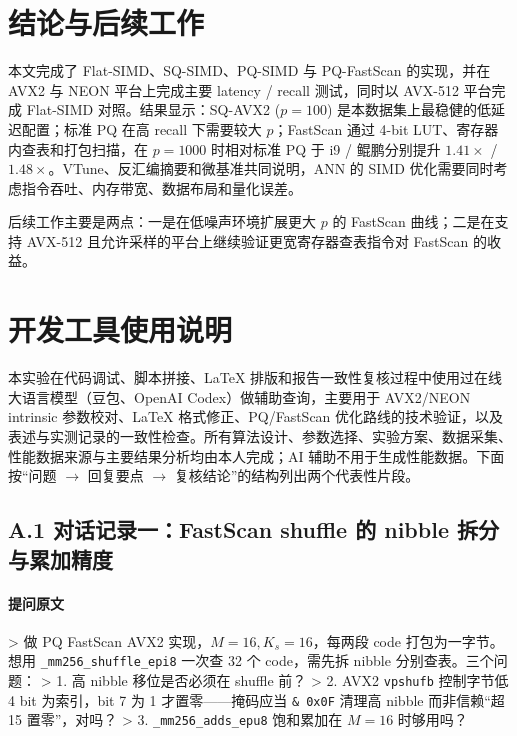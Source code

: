 \documentclass[a4paper,11pt,UTF8]{ctexart}
\begin{document}
\section{结论与后续工作}

本文完成了 Flat-SIMD、SQ-SIMD、PQ-SIMD 与 PQ-FastScan 的实现，并在 AVX2 与 NEON 平台上完成主要 latency / recall 测试，同时以 AVX-512 平台完成 Flat-SIMD 对照。结果显示：SQ-AVX2 ($p=100$) 是本数据集上最稳健的低延迟配置；标准 PQ 在高 recall 下需要较大 $p$；FastScan 通过 4-bit LUT、寄存器内查表和打包扫描，在 $p=1000$ 时相对标准 PQ 于 i9 / 鲲鹏分别提升 $1.41\times$ / $1.48\times$。VTune、反汇编摘要和微基准共同说明，ANN 的 SIMD 优化需要同时考虑指令吞吐、内存带宽、数据布局和量化误差。

后续工作主要是两点：一是在低噪声环境扩展更大 $p$ 的 FastScan 曲线；二是在支持 AVX-512 且允许采样的平台上继续验证更宽寄存器查表指令对 FastScan 的收益。

\label{sec:endbody}
\label{LastBodyPage}

\clearpage
\appendix
\setcounter{page}{1}
\renewcommand{\thepage}{A-\arabic{page}}
\cfoot{\thepage}
\section{开发工具使用说明}

本实验在代码调试、脚本拼接、\LaTeX{} 排版和报告一致性复核过程中使用过在线大语言模型（豆包、OpenAI Codex）做辅助查询，主要用于 AVX2/NEON intrinsic 参数校对、\LaTeX{} 格式修正、PQ/FastScan 优化路线的技术验证，以及表述与实测记录的一致性检查。所有算法设计、参数选择、实验方案、数据采集、性能数据来源与主要结果分析均由本人完成；AI 辅助不用于生成性能数据。下面按``问题 $\to$ 回复要点 $\to$ 复核结论''的结构列出两个代表性片段。

\subsection*{A.1 对话记录一：FastScan shuffle 的 nibble 拆分与累加精度}

\paragraph{提问原文}

> 做 PQ FastScan AVX2 实现，$M=16,K_s=16$，每两段 code 打包为一字节。想用 \texttt{\_mm256\_shuffle\_epi8} 一次查 32 个 code，需先拆 nibble 分别查表。三个问题：
> 1. 高 nibble 移位是否必须在 shuffle 前？
> 2. AVX2 \texttt{vpshufb} 控制字节低 4 bit 为索引，bit 7 为 1 才置零——掩码应当 \texttt{\& 0x0F} 清理高 nibble 而非信赖``超 15 置零''，对吗？
> 3. \texttt{\_mm256\_adds\_epu8} 饱和累加在 $M=16$ 时够用吗？
\end{document}
